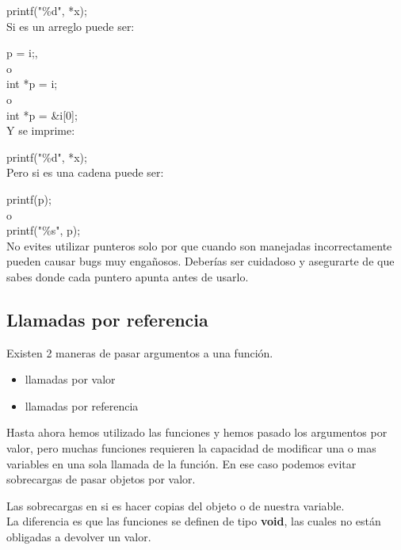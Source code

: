 \documentclass[]{article}
\begin{document}
	printf("\%d", *x);\\
	
	Si es un arreglo puede ser:
	
	p = i;,\\
	
	o\\
	
	int *p = i;\\
	
	o\\
	
	int *p = \&i[0];\\
	
	Y se imprime:
	
	printf("\%d", *x);\\
	
	Pero si es una cadena puede ser:
	
	printf(p);\\
	
	o\\
	
	printf("\%s", p);\\
	
	No evites utilizar punteros solo por que cuando son manejadas incorrectamente pueden causar bugs muy engañosos. Deberías ser cuidadoso y asegurarte de que sabes donde cada puntero apunta antes de usarlo.\\
	
	

	\subsection{Llamadas por referencia}
	Existen 2 maneras de pasar argumentos a una función.
	\begin{itemize}
		\item llamadas por valor
		\item llamadas por referencia
	\end{itemize}
	
	Hasta ahora hemos utilizado las funciones y hemos pasado los argumentos por valor, pero muchas funciones requieren la capacidad de modificar una o mas variables en una sola llamada de la función. En ese caso podemos evitar sobrecargas de pasar objetos por valor.
	
	Las sobrecargas en si es hacer copias del objeto o de nuestra variable.\\
	
	La diferencia es que las funciones se definen de tipo \textbf{void}, las cuales no están obligadas a devolver un valor.\\
	
\end{document}
